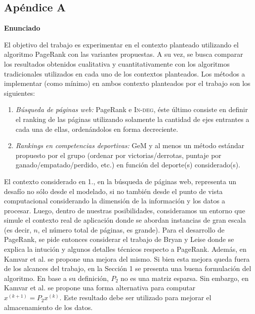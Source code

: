 \subsection{Apéndice A}


\vskip 5pt
\noindent\textbf{Enunciado}
\vskip 5pt

El objetivo del trabajo es experimentar en el contexto planteado utilizando el algoritmo PageRank con las variantes propuestas. A su vez, se busca
comparar los resultados obtenidos cualitativa y cuantitativamente con los algoritmos tradicionales utilizados en cada uno de los contextos planteados. 
Los m\'etodos a implementar (como m\'inimo) en ambos contexto planteados por el trabajo son los siguientes:

\begin{enumerate}
\item \emph{B\'usqueda de p\'aginas web:} PageRank e \textsc{In-deg}, \'este \'ultimo consiste en definir el ranking de las p\'aginas utilizando 
solamente la cantidad de ejes entrantes a cada una de ellas, orden\'andolos en forma decreciente.
\item \emph{Rankings en competencias deportivas:} GeM y al menos un m\'etodo est\'andar propuesto por el grupo (ordenar por victorias/derrotas,
puntaje por ganado/empatado/perdido, etc.) en funci\'on del deporte(s) considerado(s).
\end{enumerate}

El contexto considerado en 1., en la b\'usqueda de p\'aginas web, representa un desaf\'io no s\'olo desde el modelado, si no tambi\'en desde el punto 
de vista computacional considerando la dimensi\'on de la informaci\'on y los datos a procesar. Luego, dentro de nuestras posibilidades, consideramos
un entorno que simule el contexto real de aplicaci\'on donde se abordan  instancias de gran escala (es decir, $n$, el n\'umero total de p\'aginas, es 
grande). Para el desarrollo de PageRank, se pide entonces considerar el trabajo de Bryan y Leise \cite{Bryan2006} donde se explica la intuci\'on y algunos 
detalles t\'ecnicos respecto a PageRank. Adem\'as, en Kamvar et al. \cite{Kamvar2003} se propone una mejora del mismo. Si bien esta mejora queda fuera de 
los alcances del trabajo, en la Secci\'on 1 se presenta una buena formulaci\'on del algoritmo. En base a su definici\'on, $P_2$ no es una matriz esparsa. 
Sin embargo, en Kamvar et al. \cite[Algoritmo 1]{Kamvar2003} se propone una forma alternativa para computar $x^{(k+1)} = P_2 x^{(k)}$. Este resultado debe 
ser utilizado para mejorar el almacenamiento de los datos.

